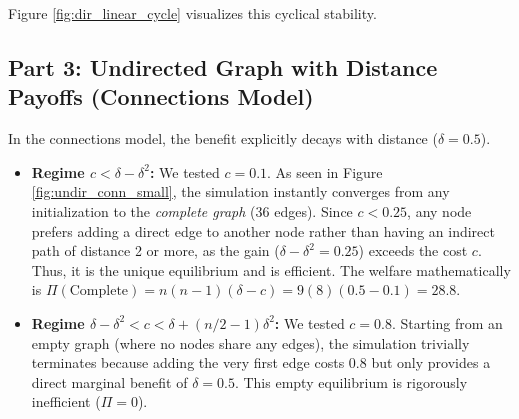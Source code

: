 \documentclass{article}
\begin{document}
Figure \ref{fig:dir_linear_cycle} visualizes this cyclical stability.

\subsection*{Part 3: Undirected Graph with Distance Payoffs (Connections Model)}
In the connections model, the benefit explicitly decays with distance ($\delta = 0.5$).
\begin{itemize}
    \item \textbf{Regime $c < \delta - \delta^2$:} We tested $c=0.1$. As seen in Figure \ref{fig:undir_conn_small}, the simulation instantly converges from any initialization to the \textit{complete graph} (36 edges). Since $c < 0.25$, any node prefers adding a direct edge to another node rather than having an indirect path of distance 2 or more, as the gain ($\delta - \delta^2 = 0.25$) exceeds the cost $c$. Thus, it is the unique equilibrium and is efficient. The welfare mathematically is $\Pi(\text{Complete}) = n(n-1)(\delta - c) = 9(8)(0.5 - 0.1) = 28.8$.
    \item \textbf{Regime $\delta - \delta^2 < c < \delta + (n/2 - 1)\delta^2$:} We tested $c=0.8$. Starting from an empty graph (where no nodes share any edges), the simulation trivially terminates because adding the very first edge costs $0.8$ but only provides a direct marginal benefit of $\delta=0.5$. This empty equilibrium is rigorously inefficient ($\Pi=0$). 
    

\end{itemize}
\end{document}
